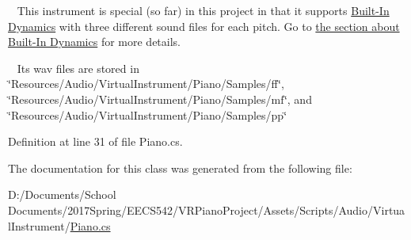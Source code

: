 ~\newline
 This instrument is special (so far) in this project in that it supports \hyperlink{group___audio_DefBID}{Built-\/\+In Dynamics} with three different sound files for each pitch. Go to \hyperlink{group___audio_DefBID}{the section about Built-\/\+In Dynamics} for more details.

~\newline
 Its wav files are stored in \char`\"{}\+Resources/\+Audio/\+Virtual\+Instrument/\+Piano/\+Samples/ff\char`\"{}, \char`\"{}\+Resources/\+Audio/\+Virtual\+Instrument/\+Piano/\+Samples/mf\char`\"{}, and \char`\"{}\+Resources/\+Audio/\+Virtual\+Instrument/\+Piano/\+Samples/pp\char`\"{} 

Definition at line 31 of file Piano.\+cs.



The documentation for this class was generated from the following file\+:\begin{DoxyCompactItemize}
\item 
D\+:/\+Documents/\+School Documents/2017\+Spring/\+E\+E\+C\+S542/\+V\+R\+Piano\+Project/\+Assets/\+Scripts/\+Audio/\+Virtual\+Instrument/\hyperlink{_piano_8cs}{Piano.\+cs}\end{DoxyCompactItemize}
